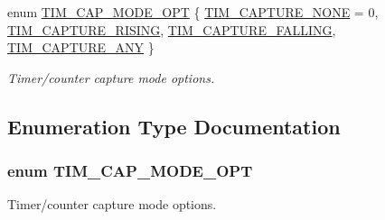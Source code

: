 \begin{DoxyCompactItemize}
enum \hyperlink{group___t_i_m___public___types_ga3b003a826527b6a7d3d4dfa22613f121}{\-T\-I\-M\-\_\-\-C\-A\-P\-\_\-\-M\-O\-D\-E\-\_\-\-O\-P\-T} \{ \hyperlink{group___t_i_m___public___types_gga3b003a826527b6a7d3d4dfa22613f121a763b7daba98dba6a94ed60a3af8e92c2}{\-T\-I\-M\-\_\-\-C\-A\-P\-T\-U\-R\-E\-\_\-\-N\-O\-N\-E} =  0, 
\hyperlink{group___t_i_m___public___types_gga3b003a826527b6a7d3d4dfa22613f121a3881a441c6c767a9bd68adec426fdc9d}{\-T\-I\-M\-\_\-\-C\-A\-P\-T\-U\-R\-E\-\_\-\-R\-I\-S\-I\-N\-G}, 
\hyperlink{group___t_i_m___public___types_gga3b003a826527b6a7d3d4dfa22613f121aeabba1d19fd87d7f27991a847e0bbde9}{\-T\-I\-M\-\_\-\-C\-A\-P\-T\-U\-R\-E\-\_\-\-F\-A\-L\-L\-I\-N\-G}, 
\hyperlink{group___t_i_m___public___types_gga3b003a826527b6a7d3d4dfa22613f121a36bf6674eddb4a127ff8143423d85148}{\-T\-I\-M\-\_\-\-C\-A\-P\-T\-U\-R\-E\-\_\-\-A\-N\-Y}
 \}
\begin{DoxyCompactList}\small\item\em \-Timer/counter capture mode options. \end{DoxyCompactList}\end{DoxyCompactItemize}


\subsection{\-Enumeration \-Type \-Documentation}
\hypertarget{group___t_i_m___public___types_ga3b003a826527b6a7d3d4dfa22613f121}{
\subsubsection[{\-T\-I\-M\-\_\-\-C\-A\-P\-\_\-\-M\-O\-D\-E\-\_\-\-O\-P\-T}]{\setlength{\rightskip}{0pt plus 5cm}enum {\bf \-T\-I\-M\-\_\-\-C\-A\-P\-\_\-\-M\-O\-D\-E\-\_\-\-O\-P\-T}}}\label{group___t_i_m___public___types_ga3b003a826527b6a7d3d4dfa22613f121}


\-Timer/counter capture mode options. 

